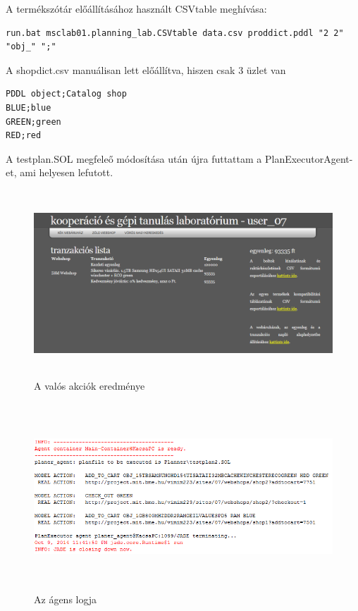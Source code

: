 A termékszótár előállításához használt CSVtable meghívása:
\begin{lstlisting}[frame=single,float=!ht]
run.bat msclab01.planning_lab.CSVtable data.csv proddict.pddl "2 2" "obj_" ";"
\end{lstlisting}
A shopdict.csv manuálisan lett előállítva, hiszen csak 3 üzlet van
\begin{lstlisting}[frame=single,float=!ht]
PDDL object;Catalog shop
BLUE;blue
GREEN;green
RED;red
\end{lstlisting}
A testplan.SOL megfeleő módosítása után újra futtattam a PlanExecutorAgent-et, ami helyesen lefutott.
\begin{figure}[h]
\begin{center}
\includegraphics[height=7cm]{figures/web1.png}
\caption{A valós akciók eredménye}
\end{center}
\end{figure}
\begin{figure}[h]
\begin{center}
\includegraphics[height=7cm]{figures/dump1.png}
\caption{Az ágens logja}
\end{center}
\end{figure}

